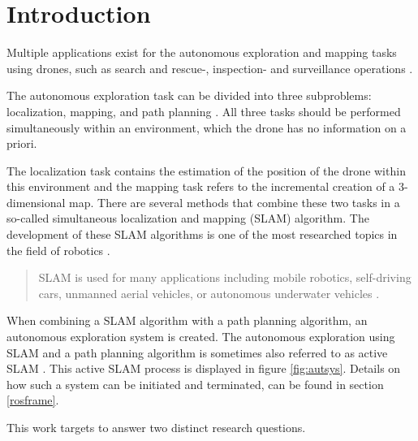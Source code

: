 \chapter{Introduction}

Multiple applications exist for the autonomous exploration and mapping tasks using drones,
 such as search and rescue-, inspection- and surveillance operations \cite{usecases}. 
 
 The autonomous exploration task can be divided into three subproblems: localization, mapping, and path planning \cite{accurat}. 
 All three tasks should be performed simultaneously within an environment, which the drone has no information on a priori. 
 
 The localization task contains the estimation of the position of the drone within this environment and the mapping task refers to 
 the incremental creation of a 3-dimensional map. There are several methods that combine these two tasks in a so-called 
 simultaneous localization and mapping (SLAM) algorithm. The development of these SLAM algorithms is one of the most researched topics 
in the field of robotics \cite{slamintro}.

\begin{quote}
SLAM is used for many applications including mobile robotics, self-driving cars, unmanned
aerial vehicles, or autonomous underwater vehicles \cite{quote1}.
\end{quote}

 When combining a SLAM algorithm with a path planning algorithm, an autonomous exploration 
system is created. The autonomous exploration using SLAM and a path planning algorithm is sometimes also referred to as active SLAM \cite{inproceedings}. 
This active SLAM process is displayed in figure \ref{fig:autsys}. Details on how such a system can be initiated and terminated, can be found in section 
\ref{rosframe}.
 
 
This work targets to answer two distinct research questions. 
 
